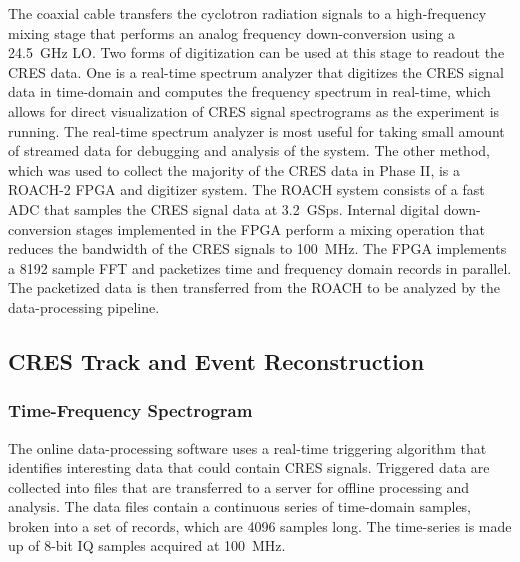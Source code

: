 The coaxial cable transfers the cyclotron radiation signals to a high-frequency mixing stage that performs an analog frequency down-conversion using a 24.5~GHz LO. Two forms of digitization can be used at this stage to readout the CRES data. One is a real-time spectrum analyzer that digitizes the CRES signal data in time-domain and computes the frequency spectrum in real-time, which allows for direct visualization of CRES signal spectrograms as the experiment is running. The real-time spectrum analyzer is most useful for taking small amount of streamed data for debugging and analysis of the system. The other method, which was used to collect the majority of the CRES data in Phase II, is a ROACH-2 FPGA and digitizer system. The ROACH system consists of a fast ADC that samples the CRES signal data at 3.2~GSps. Internal digital down-conversion stages implemented in the FPGA perform a mixing operation that reduces the bandwidth of the CRES signals to 100~MHz. The FPGA implements a 8192 sample FFT and packetizes time and frequency domain records in parallel. The packetized data is then transferred from the ROACH to be analyzed by the data-processing pipeline.

\subsection{CRES Track and Event Reconstruction}

\subsubsection*{Time-Frequency Spectrogram}

The online data-processing software uses a real-time triggering algorithm that identifies interesting data that could contain CRES signals. Triggered data are collected into files that are transferred to a server for offline processing and analysis. The data files contain a continuous series of time-domain samples, broken into a set of records, which are 4096 samples long. The time-series is made up of 8-bit IQ samples acquired at 100~MHz. 

